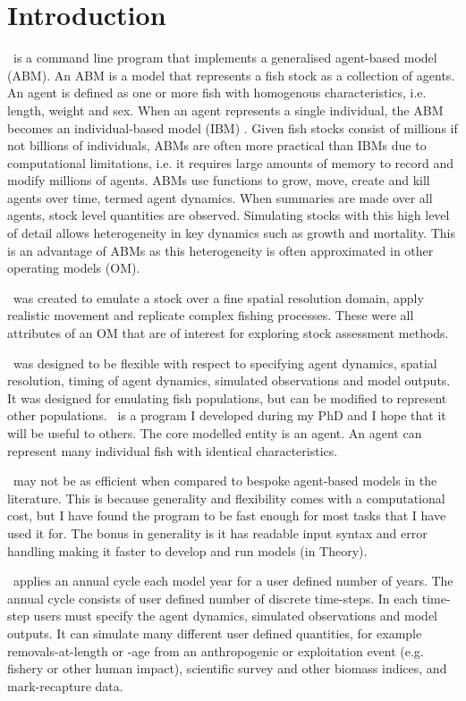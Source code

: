 \section{Introduction\label{sec:Introduction}} 

\IBM\ is a command line program that implements a generalised agent-based model (ABM). An ABM is a model that represents a fish stock as a collection of agents. An agent is defined as one or more fish with homogenous characteristics, i.e. length, weight and sex. When an agent represents a single individual, the ABM becomes an individual-based model (IBM) \citep{grimm2013individual}. Given fish stocks consist of millions if not billions of individuals, ABMs are often more practical than IBMs due to computational limitations, i.e. it requires large amounts of memory to record and modify millions of agents. ABMs use functions to grow, move, create and kill agents over time, termed agent dynamics. When summaries are made over all agents, stock level quantities are observed. Simulating stocks with this high level of detail allows heterogeneity in key dynamics such as growth and mortality. This is an advantage of ABMs as this heterogeneity is often approximated in other operating models (OM).


\IBM\ was created to emulate a stock over a fine spatial resolution domain, apply realistic movement and replicate complex fishing processes. These were all attributes of an OM that are of interest for exploring stock assessment methods. 

\IBM\ was designed to be flexible with respect to specifying agent dynamics, spatial resolution, timing of agent dynamics, simulated observations and model outputs. It was designed for emulating fish populations, but can be modified to represent other populations. \IBM\ is a program I developed during my PhD and I hope that it will be useful to others. The core modelled entity is an agent. An agent can represent many individual fish with identical characteristics. 

\IBM\ may not be as efficient when compared to bespoke agent-based models in the literature. This is because generality and flexibility comes with a computational cost, but I have found the program to be fast enough for most tasks that I have used it for. The bonus in generality is it has readable input syntax and error handling making it faster to develop and run models (in Theory).

\IBM\ applies an annual cycle each model year for a user defined number of years. The annual cycle consists of user defined number of discrete time-steps. In each time-step users must specify the agent dynamics, simulated observations and model outputs. It can simulate many different user defined quantities, for example removals-at-length or -age from an anthropogenic or exploitation event (e.g. fishery or other human impact), scientific survey and other biomass indices, and mark-recapture data.

